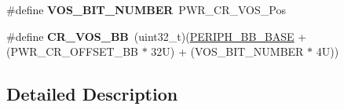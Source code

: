 \begin{DoxyCompactItemize}
\#define {\bfseries V\+O\+S\+\_\+\+B\+I\+T\+\_\+\+N\+U\+M\+B\+ER}~P\+W\+R\+\_\+\+C\+R\+\_\+\+V\+O\+S\+\_\+\+Pos
\item 
\mbox{\label{group___p_w_r___c_r__register__alias_ga98bf66513495732b9b3ee21f182e1591}} 
\#define {\bfseries C\+R\+\_\+\+V\+O\+S\+\_\+\+BB}~(uint32\+\_\+t)(\mbox{\hyperlink{group___peripheral__memory__map_gaed7efc100877000845c236ccdc9e144a}{P\+E\+R\+I\+P\+H\+\_\+\+B\+B\+\_\+\+B\+A\+SE}} + (P\+W\+R\+\_\+\+C\+R\+\_\+\+O\+F\+F\+S\+E\+T\+\_\+\+BB $\ast$ 32\+U) + (\+V\+O\+S\+\_\+\+B\+I\+T\+\_\+\+N\+U\+M\+B\+E\+R $\ast$ 4\+U))
\end{DoxyCompactItemize}


\subsection{Detailed Description}
